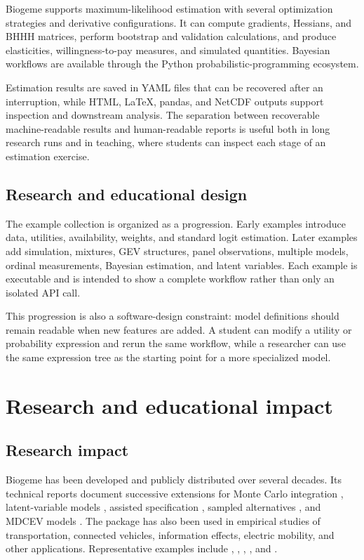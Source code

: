 \documentclass[11pt]{article}
\begin{document}
Biogeme supports maximum-likelihood estimation with several optimization
strategies and derivative configurations. It can compute gradients, Hessians,
and BHHH matrices, perform bootstrap and validation calculations, and produce
elasticities, willingness-to-pay measures, and simulated quantities. Bayesian
workflows are available through the Python probabilistic-programming
ecosystem.

Estimation results are saved in YAML files that can be recovered after an
interruption, while HTML, LaTeX, pandas, and NetCDF outputs support inspection
and downstream analysis. The separation between recoverable machine-readable
results and human-readable reports is useful both in long research runs and in
teaching, where students can inspect each stage of an estimation exercise.

\subsection{Research and educational design}

The example collection is organized as a progression. Early examples introduce
data, utilities, availability, weights, and standard logit estimation. Later
examples add simulation, mixtures, GEV structures, panel observations,
multiple models, ordinal measurements, Bayesian estimation, and latent
variables. Each example is executable and is intended to show a complete
workflow rather than only an isolated API call.

This progression is also a software-design constraint: model definitions should
remain readable when new features are added. A student can modify a utility or
probability expression and rerun the same workflow, while a researcher can use
the same expression tree as the starting point for a more specialized model.

\section{Research and educational impact}

\subsection{Research impact}

Biogeme has been developed and publicly distributed over several decades. Its
technical reports document successive extensions for Monte Carlo integration
\citep{Bierlaire2015}, latent-variable models \citep{Bierlaire2016Latent},
assisted specification \citep{Ortelli2020}, sampled alternatives
\citep{BierlairePaschalidis2023}, and MDCEV models \citep{BierlaireWang2024}.
The package has also been used in empirical studies of transportation,
connected vehicles, information effects, electric mobility, and other
applications. Representative examples include \citet{Chorus2007},
\citet{Derikx2016}, \citet{Kajanova2021}, \citet{Gerzinic2022}, and
\citet{Nigro2024}.
\end{document}
